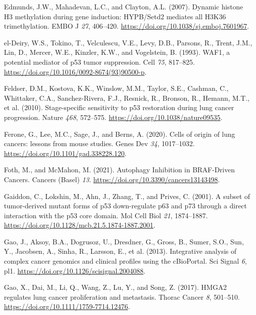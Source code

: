 \begin{CSLReferences}{0}{0}
\leavevmode{}%
Edmunds, J.W., Mahadevan, L.C., and Clayton, A.L. (2007). Dynamic histone H3 methylation during gene induction: HYPB/Setd2 mediates all H3K36 trimethylation. EMBO J \emph{27}, 406--420. \url{https://doi.org/10.1038/sj.emboj.7601967}.

\leavevmode{}%
el-Deiry, W.S., Tokino, T., Velculescu, V.E., Levy, D.B., Parsons, R., Trent, J.M., Lin, D., Mercer, W.E., Kinzler, K.W., and Vogelstein, B. (1993). WAF1, a potential mediator of p53 tumor suppression. Cell \emph{75}, 817--825. \url{https://doi.org/10.1016/0092-8674(93)90500-p}.

\leavevmode{}%
Feldser, D.M., Kostova, K.K., Winslow, M.M., Taylor, S.E., Cashman, C., Whittaker, C.A., Sanchez-Rivera, F.J., Resnick, R., Bronson, R., Hemann, M.T., et al. (2010). Stage-specific sensitivity to p53 restoration during lung cancer progression. Nature \emph{468}, 572--575. \url{https://doi.org/10.1038/nature09535}.

\leavevmode{}%
Ferone, G., Lee, M.C., Sage, J., and Berns, A. (2020). Cells of origin of lung cancers: lessons from mouse studies. Genes Dev \emph{34}, 1017--1032. \url{https://doi.org/10.1101/gad.338228.120}.

\leavevmode{}%
Foth, M., and McMahon, M. (2021). Autophagy Inhibition in BRAF-Driven Cancers. Cancers (Basel) \emph{13}. \url{https://doi.org/10.3390/cancers13143498}.

\leavevmode{}%
Gaiddon, C., Lokshin, M., Ahn, J., Zhang, T., and Prives, C. (2001). A subset of tumor-derived mutant forms of p53 down-regulate p63 and p73 through a direct interaction with the p53 core domain. Mol Cell Biol \emph{21}, 1874--1887. \url{https://doi.org/10.1128/mcb.21.5.1874-1887.2001}.

\leavevmode{}%
Gao, J., Aksoy, B.A., Dogrusoz, U., Dresdner, G., Gross, B., Sumer, S.O., Sun, Y., Jacobsen, A., Sinha, R., Larsson, E., et al. (2013). Integrative analysis of complex cancer genomics and clinical profiles using the cBioPortal. Sci Signal \emph{6}, pl1. \url{https://doi.org/10.1126/scisignal.2004088}.

\leavevmode{}%
Gao, X., Dai, M., Li, Q., Wang, Z., Lu, Y., and Song, Z. (2017). HMGA2 regulates lung cancer proliferation and metastasis. Thorac Cancer \emph{8}, 501--510. \url{https://doi.org/10.1111/1759-7714.12476}.


\end{CSLReferences}
